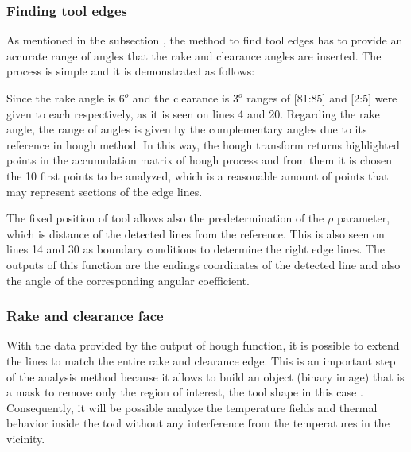 		\subsubsection{Finding tool edges}

			As mentioned in the subsection , the method to find tool edges has to provide an accurate range of angles that the rake and clearance angles are inserted. The process is simple and it is demonstrated as follows:

			

			Since the rake angle is $6^{o}$ and the clearance is $3^{o}$ ranges of [81:85] and [2:5] were given to each respectively, as it is seen on lines 4 and 20. Regarding the rake angle, the range of angles is given by the complementary angles due to its reference in hough method. In this way, the hough transform returns highlighted points in the accumulation matrix of hough process and from them it is chosen the 10 first points to be analyzed, which is a reasonable amount of points that may represent sections of the edge lines.

			The fixed position of tool allows also the predetermination of the $\rho$ parameter, which is distance of the detected lines from the reference. This is also seen on lines 14 and 30 as boundary conditions to determine the right edge lines. The outputs of this function are the endings coordinates of the detected line and also the angle of the corresponding angular coefficient. 

		\subsubsection{Rake and clearance face}

			With the data provided by the output of hough function, it is possible to extend the lines to match the entire rake and clearance edge. This is an important step of the analysis method because it allows to build an object (binary image) that is a mask to remove only the region of interest, the tool shape in this case . Consequently, it will be possible analyze the temperature fields and thermal behavior inside the tool without any interference from the temperatures in the vicinity.

